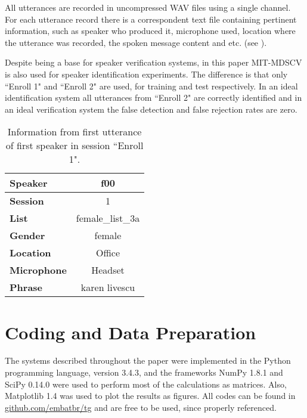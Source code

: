 All utterances are recorded in uncompressed WAV files using a single channel. For each utterance record there is a correspondent text file containing pertinent information, such as speaker who produced it, microphone used, location where the utterance was recorded, the spoken message content and etc. (see ).

Despite being a base for speaker verification systems, in this paper MIT-MDSCV is also used for speaker identification experiments. The difference is that only ``Enroll 1" and ``Enroll 2" are used, for training and test respectively. In an ideal identification system all utterances from ``Enroll 2" are correctly identified and in an ideal verification system the false detection and false rejection rates are zero.

\begin{table}[h]
    \small
    \centering
    \begin{tabular}{|l|c|}
    \hline
    {\bf Speaker}    & f00              \\ \hline
    {\bf Session}    & 1                \\ \hline
    {\bf List}       & female\_list\_3a \\ \hline
    {\bf Gender}     & female           \\ \hline
    {\bf Location}   & Office           \\ \hline
    {\bf Microphone} & Headset          \\ \hline
    {\bf Phrase}     & karen livescu    \\ \hline
    \end{tabular}
    \caption{Information from first utterance of first speaker in session ``Enroll 1".}
    \label{tab:utterance-info}
\end{table}

\section{Coding and Data Preparation}
\label{sec:coding-and-data-preparation}

The systems described throughout the paper were implemented in the Python programming language, version 3.4.3, and the frameworks NumPy 1.8.1 and SciPy 0.14.0 were used to perform most of the calculations as matrices. Also, Matplotlib 1.4 was used to plot the results as figures. All codes can be found in \url{github.com/embatbr/tg} and are free to be used, since properly referenced.

